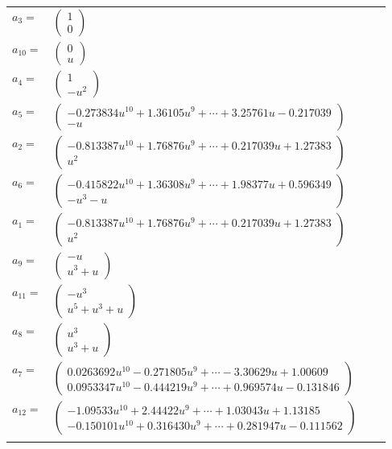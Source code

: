 \documentclass[1p]{elsarticle_modified}
\theoremstyle{definition}
\begin{document}
\begin{tabular}{m{7pt} m{180pt} m{7pt} m{180pt} }
\flushright $a_{3}=$&$\begin{pmatrix}1\\0\end{pmatrix}$ \\
\flushright $a_{10}=$&$\begin{pmatrix}0\\u\end{pmatrix}$ \\
\flushright $a_{4}=$&$\begin{pmatrix}1\\- u^2\end{pmatrix}$ \\
\flushright $a_{5}=$&$\begin{pmatrix}-0.273834 u^{10}+1.36105 u^{9}+\cdots+3.25761 u-0.217039\\- u\end{pmatrix}$ \\
\flushright $a_{2}=$&$\begin{pmatrix}-0.813387 u^{10}+1.76876 u^{9}+\cdots+0.217039 u+1.27383\\u^2\end{pmatrix}$ \\
\flushright $a_{6}=$&$\begin{pmatrix}-0.415822 u^{10}+1.36308 u^{9}+\cdots+1.98377 u+0.596349\\- u^3- u\end{pmatrix}$ \\
\flushright $a_{1}=$&$\begin{pmatrix}-0.813387 u^{10}+1.76876 u^{9}+\cdots+0.217039 u+1.27383\\u^2\end{pmatrix}$ \\
\flushright $a_{9}=$&$\begin{pmatrix}- u\\u^3+u\end{pmatrix}$ \\
\flushright $a_{11}=$&$\begin{pmatrix}- u^3\\u^5+u^3+u\end{pmatrix}$ \\
\flushright $a_{8}=$&$\begin{pmatrix}u^3\\u^3+u\end{pmatrix}$ \\
\flushright $a_{7}=$&$\begin{pmatrix}0.0263692 u^{10}-0.271805 u^{9}+\cdots-3.30629 u+1.00609\\0.0953347 u^{10}-0.444219 u^{9}+\cdots+0.969574 u-0.131846\end{pmatrix}$ \\
\flushright $a_{12}=$&$\begin{pmatrix}-1.09533 u^{10}+2.44422 u^{9}+\cdots+1.03043 u+1.13185\\-0.150101 u^{10}+0.316430 u^{9}+\cdots+0.281947 u-0.111562\end{pmatrix}$\\&\end{tabular}
\end{document}
